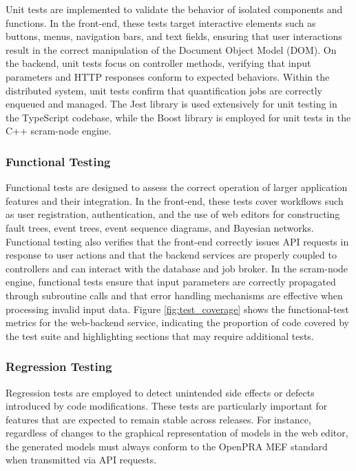 Unit tests are implemented to validate the behavior of isolated components and functions. In the front-end, these tests target interactive elements such as buttons, menus, navigation bars, and text fields, ensuring that user interactions result in the correct manipulation of the Document Object Model (DOM). On the backend, unit tests focus on controller methods, verifying that input parameters and HTTP responses conform to expected behaviors. Within the distributed system, unit tests confirm that quantification jobs are correctly enqueued and managed. The Jest library is used extensively for unit testing in the TypeScript codebase, while the Boost library is employed for unit tests in the C++ scram-node engine.

\subsubsection{Functional Testing}

Functional tests are designed to assess the correct operation of larger application features and their integration. In the front-end, these tests cover workflows such as user registration, authentication, and the use of web editors for constructing fault trees, event trees, event sequence diagrams, and Bayesian networks. Functional testing also verifies that the front-end correctly issues API requests in response to user actions and that the backend services are properly coupled to controllers and can interact with the database and job broker. In the scram-node engine, functional tests ensure that input parameters are correctly propagated through subroutine calls and that error handling mechanisms are effective when processing invalid input data. Figure \ref{fig:test_coverage} shows the functional-test metrics for the web-backend service, indicating the proportion of code covered by the test suite and highlighting sections that may require additional tests.

\subsubsection{Regression Testing}

Regression tests are employed to detect unintended side effects or defects introduced by code modifications. These tests are particularly important for features that are expected to remain stable across releases. For instance, regardless of changes to the graphical representation of models in the web editor, the generated models must always conform to the OpenPRA MEF standard when transmitted via API requests.

